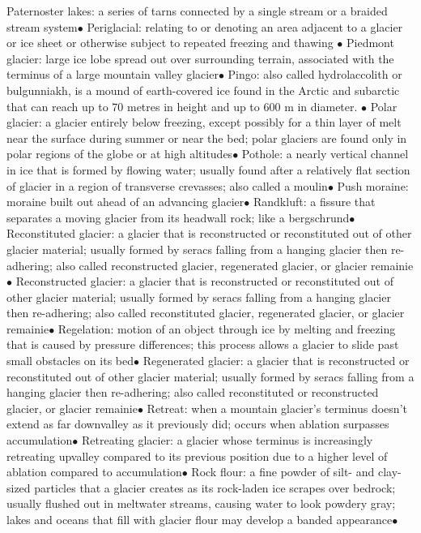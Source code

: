 \documentclass{article}
\newcommand{\ddd}{$\bullet$}
\begin{document}
\begin{multicols*}{4}
        Paternoster lakes: a series of tarns connected by a single stream or a braided stream system\ddd
        Periglacial: relating to or denoting an area adjacent to a glacier or ice sheet or otherwise subject to repeated freezing and thawing \ddd        
        Piedmont glacier: large ice lobe spread out over surrounding terrain, associated with the terminus of a large mountain valley glacier\ddd
        Pingo: also called hydrolaccolith or bulgunniakh, is a mound of earth-covered ice found in the Arctic and subarctic that can reach up to 70 metres in height and up to 600 m in diameter. \ddd       
        Polar glacier: a glacier entirely below freezing, except possibly for a thin layer of melt near the surface during summer or near the bed; polar glaciers are found only in polar regions of the globe or at high altitudes\ddd
        Pothole: a nearly vertical channel in ice that is formed by flowing water; usually found after a relatively flat section of glacier in a region of transverse crevasses; also called a moulin\ddd
        Push moraine: moraine built out ahead of an advancing glacier\ddd
        Randkluft: a fissure that separates a moving glacier from its headwall rock; like a bergschrund\ddd
        Reconstituted glacier: a glacier that is reconstructed or reconstituted out of other glacier material; usually formed by seracs falling from a hanging glacier then re-adhering; also called reconstructed glacier, regenerated glacier, or glacier remainie\ddd
        Reconstructed glacier: a glacier that is reconstructed or reconstituted out of other glacier material; usually formed by seracs falling from a hanging glacier then re-adhering; also called reconstituted glacier, regenerated glacier, or glacier remainie\ddd
        Regelation: motion of an object through ice by melting and freezing that is caused by pressure differences; this process allows a glacier to slide past small obstacles on its bed\ddd
        Regenerated glacier: a glacier that is reconstructed or reconstituted out of other glacier material; usually formed by seracs falling from a hanging glacier then re-adhering; also called reconstituted or reconstructed glacier, or glacier remainie\ddd
        Retreat: when a mountain glacier's terminus doesn't extend as far downvalley as it previously did; occurs when ablation surpasses accumulation\ddd
        Retreating glacier: a glacier whose terminus is increasingly retreating upvalley compared to its previous position due to a higher level of ablation compared to accumulation\ddd
        Rock flour: a fine powder of silt- and clay-sized particles that a glacier creates as its rock-laden ice scrapes over bedrock; usually flushed out in meltwater streams, causing water to look powdery gray; lakes and oceans that fill with glacier flour may develop a banded appearance\ddd

\end{multicols*}
\end{document}

